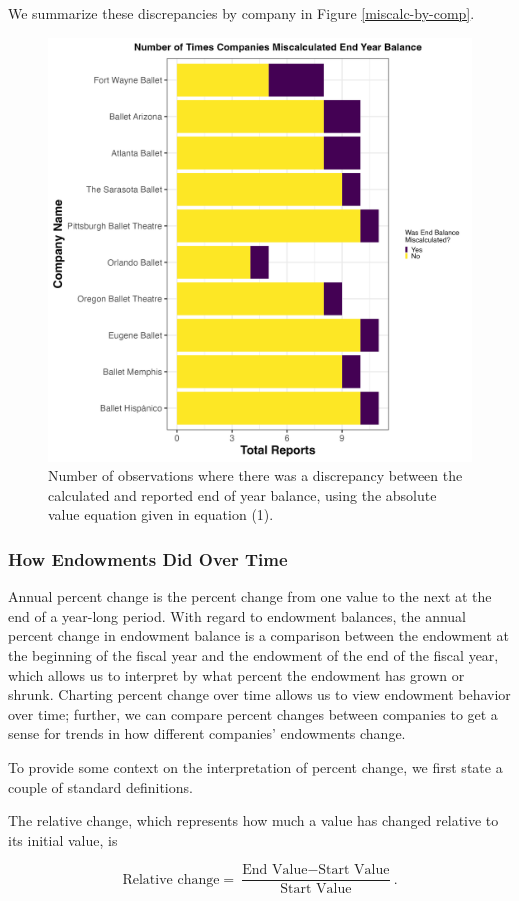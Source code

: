 \documentclass[Dance Data
Project,article,submit,moreauthors,pdftex]{mdpi}
\begin{document}
We summarize these discrepancies by company in Figure
\ref{miscalc-by-comp}.

\begin{figure}[H]
\includegraphics[width=0.5\linewidth,]{../images/miscalc_end_bal} \caption{\label{fig:miscalc-by-comp}Number of observations where there was a discrepancy between the calculated and reported end of year balance, using the absolute value equation given in equation (1).}\label{fig:miscalc-by-comp}
\end{figure}

\hypertarget{how-endowments-did-over-time}{%
\subsubsection{How Endowments Did Over
Time}\label{how-endowments-did-over-time}}

Annual percent change is the percent change from one value to the next
at the end of a year-long period. With regard to endowment balances, the
annual percent change in endowment balance is a comparison between the
endowment at the beginning of the fiscal year and the endowment of the
end of the fiscal year, which allows us to interpret by what percent the
endowment has grown or shrunk. Charting percent change over time allows
us to view endowment behavior over time; further, we can compare percent
changes between companies to get a sense for trends in how different
companies' endowments change.

To provide some context on the interpretation of percent change, we
first state a couple of standard definitions.

The relative change, which represents how much a value has changed
relative to its initial value, is

\[\text{Relative change} = \dfrac{\text{End Value} - \text{Start Value}}{ \text{Start Value}}.\]
\end{document}

